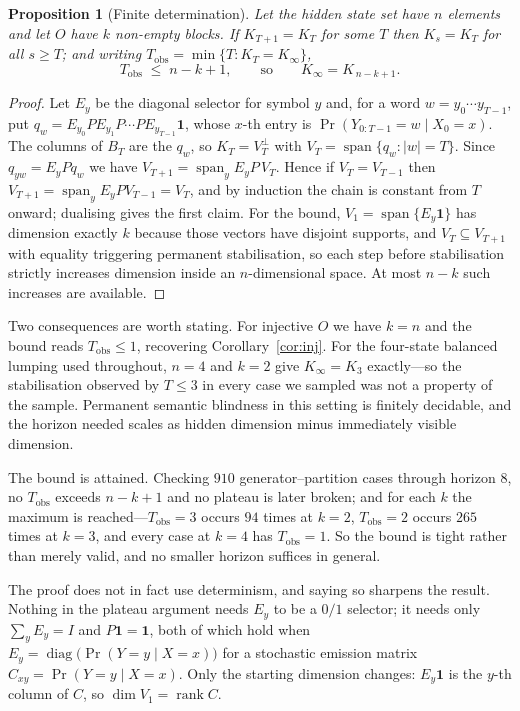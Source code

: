 \documentclass[11pt]{article}
\newtheorem{proposition}{Proposition}
\begin{document}
\begin{proposition}[Finite determination]\label{prop:finite}
Let the hidden state set have $n$ elements and let $O$ have $k$ non-empty blocks. If
$K_{T+1} = K_T$ for some $T$ then $K_s = K_T$ for all $s \ge T$; and writing
$T_{\mathrm{obs}} = \min\{T : K_T = K_\infty\}$,
\[
  T_{\mathrm{obs}} \;\le\; n - k + 1,
  \qquad\text{so}\qquad
  K_\infty = K_{\,n-k+1}.
\]
\end{proposition}
\begin{proof}
Let $E_y$ be the diagonal selector for symbol $y$ and, for a word
$w = y_0 \cdots y_{T-1}$, put
$q_w = E_{y_0} P E_{y_1} P \cdots P E_{y_{T-1}} \mathbf{1}$, whose $x$-th entry is
$\Pr(Y_{0:T-1} = w \mid X_0 = x)$. The columns of $B_T$ are the $q_w$, so
$K_T = V_T^\perp$ with $V_T = \operatorname{span}\{q_w : |w| = T\}$. Since
$q_{yw} = E_y P q_w$ we have $V_{T+1} = \operatorname{span}_y E_y P\, V_T$. Hence if
$V_T = V_{T-1}$ then $V_{T+1} = \operatorname{span}_y E_y P V_{T-1} = V_T$, and by induction
the chain is constant from $T$ onward; dualising gives the first claim. For the bound,
$V_1 = \operatorname{span}\{E_y \mathbf{1}\}$ has dimension exactly $k$ because those
vectors have disjoint supports, and $V_T \subseteq V_{T+1}$ with equality triggering
permanent stabilisation, so each step before stabilisation strictly increases dimension
inside an $n$-dimensional space. At most $n-k$ such increases are available.
\end{proof}

Two consequences are worth stating. For injective $O$ we have $k = n$ and the bound reads
$T_{\mathrm{obs}} \le 1$, recovering Corollary~\ref{cor:inj}. For the four-state balanced
lumping used throughout, $n = 4$ and $k = 2$ give $K_\infty = K_3$ exactly---so the
stabilisation observed by $T \le 3$ in every case we sampled was not a property of the
sample. Permanent semantic blindness in this setting is finitely decidable, and the horizon
needed scales as hidden dimension minus immediately visible dimension.

The bound is attained. Checking $910$ generator--partition cases through horizon $8$, no
$T_{\mathrm{obs}}$ exceeds $n-k+1$ and no plateau is later broken; and for each $k$ the
maximum is reached---$T_{\mathrm{obs}} = 3$ occurs $94$ times at $k=2$, $T_{\mathrm{obs}} = 2$
occurs $265$ times at $k=3$, and every case at $k=4$ has $T_{\mathrm{obs}} = 1$. So the
bound is tight rather than merely valid, and no smaller horizon suffices in general.

The proof does not in fact use determinism, and saying so sharpens the result. Nothing in
the plateau argument needs $E_y$ to be a $0/1$ selector; it needs only
$\sum_y E_y = I$ and $P\mathbf{1} = \mathbf{1}$, both of which hold when
$E_y = \operatorname{diag}\big(\Pr(Y = y \mid X = x)\big)$ for a stochastic emission
matrix $C_{xy} = \Pr(Y=y \mid X=x)$. Only the starting dimension changes: $E_y\mathbf{1}$
is the $y$-th column of $C$, so $\dim V_1 = \operatorname{rank} C$.
\end{document}
